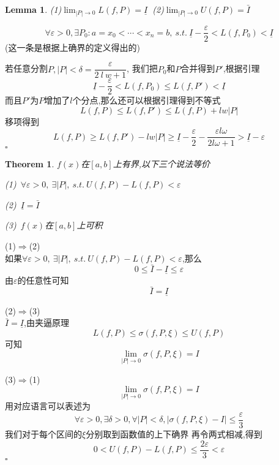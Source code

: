 \documentclass[11pt,hyperref,a4paper,UTF8]{ctexart}
\newtheorem{theorem}{Theorem}[subsection]
\newtheorem{lemma}{Lemma}[subsection]
\newenvironment{cproof}{%
\heiti{证明}\kaishu
}{%
  \hfill $\square$
  \par\bigskip
}
\begin{document}
\begin{CJK}{UTF8}{gkai}
\begin{lemma}
  (1)$\lim_{|P|\to 0}L(f,P) = \underline{I}~$
  (2)$\lim_{|P|\to 0}U(f,P) = \bar{I}$

\end{lemma}

\begin{cproof}
  \[\forall \varepsilon > 0 ,\exists P_0 : a = x_0 < \cdots < x_n = b, ~s.t.~ \underline{I} - \dfrac{\varepsilon}{2} < L(f 
  ,P_0) < \underline{I}\]
  (这一条是根据上确界的定义得出的)

若任意分割$P,|P| < \delta = \dfrac{\varepsilon}{2~l~w + 1}$,
我们把$P_0$和$P$合并得到$P'$,根据引理
\[\underline{I} - \dfrac{\varepsilon}{2} < L(f,P_0) \leq L(f,P')<  \underline{I}\]
而且$P'$为$P$增加了$l$个分点,那么还可以根据引理得到不等式
\[L(f,P) \leq L(f,P') \leq L(f,P) + lw|P|\]
移项得到\[L(f,P) \geq L(f,P') - l w |P| \geq \underline{I} - \dfrac{\varepsilon}{2} - \dfrac{\varepsilon l \omega}{2 l \omega + 1} > \underline{I} - \varepsilon\]
\end{cproof}

\begin{theorem}
  $f(x)$在$[a,b]$上有界,以下三个说法等价

  (1)~$\forall \varepsilon > 0,~\exists |P|,~s.t.~ U(f,P) - L(f,P) < \varepsilon$

  (2)~$\underline{I} = \bar{I}$

  (3)~$f(x)$在$[a,b]$上可积
\end{theorem}

\begin{cproof}
(1)$\Rightarrow$(2)\\
如果$\forall \varepsilon > 0,~\exists |P|,~s.t.~ U(f,P) - L(f,P) < \varepsilon$,那么
\[0 \leq \bar{I} - \underline{I} \leq \varepsilon\]
由$\varepsilon$的任意性可知
\[\bar{I} = \underline{I}\]

(2)$\Rightarrow$(3)\\
$\bar{I} = \underline{I}$,由夹逼原理
\[L(f,P) \leq \sigma(f,P,\xi) \leq U(f,P)\]
可知
\[\lim_{|P| \to 0} \sigma(f,P,\xi) = I\]

(3)$\Rightarrow$(1)\\
\[\lim_{|P| \to 0} \sigma(f,P,\xi) = I\]
用对应语言可以表述为
\[\forall \varepsilon > 0 ,\exists \delta > 0, \forall |P| < \delta , |\sigma(f,P,\xi) - I | \leq \dfrac{\varepsilon}{3}\]
我们对于每个区间的$\xi$分别取到函数值的上下确界
再令两式相减,得到
\[ 0 < U(f,P) - L(f,P) \leq \dfrac{2\varepsilon}{3} < \varepsilon\]
\end{cproof}


\end{CJK}
\end{document}
